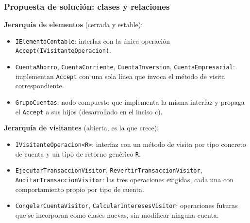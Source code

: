 \subsubsection*{Propuesta de solución: clases y relaciones}

\textbf{Jerarquía de elementos} (cerrada y estable):

\begin{itemize}[leftmargin=1.2cm]
    \item \texttt{IElementoContable}: interfaz con la única operación
          \texttt{Accept(IVisitanteOperacion)}.
    \item \texttt{CuentaAhorro}, \texttt{CuentaCorriente}, \texttt{CuentaInversion},
          \texttt{CuentaEmpresarial}: implementan \texttt{Accept} con una sola línea que invoca
          el método de visita correspondiente.
    \item \texttt{GrupoCuentas}: nodo compuesto que implementa la misma interfaz y propaga el
          \texttt{Accept} a sus hijos (desarrollado en el inciso c).
\end{itemize}

\textbf{Jerarquía de visitantes} (abierta, es la que crece):

\sloppy
\begin{itemize}[leftmargin=1.2cm]
    \item \texttt{IVisitanteOperacion<R>}: interfaz con un método de visita por tipo concreto de
          cuenta y un tipo de retorno genérico \texttt{R}.
    \item \texttt{EjecutarTransaccionVisitor}, \texttt{RevertirTransaccionVisitor},
          \texttt{AuditarTransaccionVisitor}: las tres operaciones exigidas, cada una con
          comportamiento propio por tipo de cuenta.
    \item \texttt{CongelarCuentaVisitor}, \texttt{CalcularInteresesVisitor}: operaciones futuras
          que se incorporan como clases nuevas, sin modificar ninguna cuenta.
\end{itemize}
\fussy


